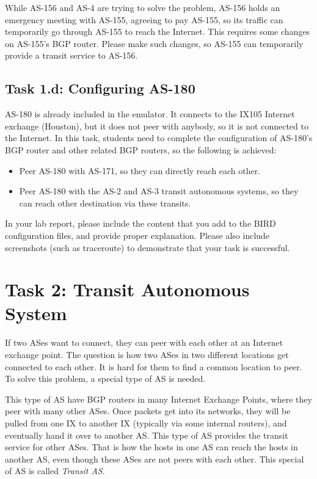 While AS-156 and AS-4 are trying to solve the problem, AS-156 holds an 
emergency meeting with AS-155, agreeing to pay AS-155, so its 
traffic can temporarily go through AS-155 to reach the Internet. 
This requires some changes on AS-155's BGP router. 
Please make such changes, so AS-155 can temporarily 
provide a transit service to AS-156.


 
\subsection{Task 1.d: Configuring AS-180} 

AS-180 is already included in the emulator. It connects to the
IX105 Internet exchange (Houston), but it does not peer with anybody, 
so it is not connected to the Internet. 
In this task, students need to complete the configuration of 
AS-180's BGP router and other related BGP routers, 
so the following is achieved:

\begin{itemize}[noitemsep]
  \item Peer AS-180 with AS-171, so they can directly reach each other.
  \item Peer AS-180 with the AS-2 and AS-3 transit autonomous systems, so they can
    reach other destination via these transits.
\end{itemize}

In your lab report, please include the content that you add to the 
BIRD configuration files, and provide proper explanation.
Please also include screenshots (such as traceroute) to demonstrate 
that your task is successful. 


\section{Task 2: Transit Autonomous System} 

If two ASes want to connect, they can peer with each other
at an Internet exchange point. The question is how two ASes in two different locations
get connected to each other. It is hard for them
to find a common location to peer. To solve this problem,
a special type of AS is needed.

This type of AS have BGP routers in many Internet
Exchange Points, where they peer with many other ASes. Once packets get into
its networks, they will be pulled from one IX to another IX (typically via
some internal routers), and eventually
hand it over to another AS. This type of AS provides the transit
service for other ASes. That is how the hosts in one AS can reach the hosts in
another AS, even though these ASes are not peers with each other.
This special of AS is called \textit{Transit AS}.

